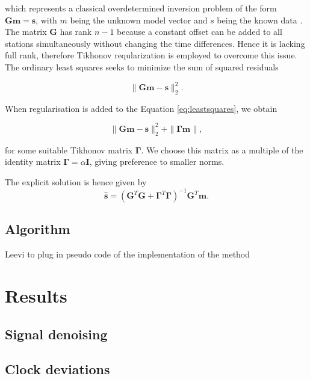 \documentclass[12pt,a4paper,english]{article}
\begin{document}
which represents a classical overdetermined inversion problem of the form $\mathbf{Gm} = \mathbf{s}$, with $m$ being the unknown model vector and $s$ being the known data \cite{sens2008}. The matrix $\mathbf{G}$ has rank $n-1$ because a constant offset can be added to all stations simultaneously without changing the time differences.
Hence it is lacking full rank, therefore Tikhonov reqularization is employed to overcome this issue. The ordinary least squares seeks to minimize the sum of squared residuals

\begin{equation}
\| \mathbf{Gm}-\mathbf{s} \|_2^2.
\label{eq:leastsquares}
\end{equation}

When regularisation is added to the Equation \ref{eq:leastsquares}, we obtain

\begin{equation}
\| \mathbf{Gm}-\mathbf{s} \|_2^2 + \| \bm{\Gamma}\mathbf{m} \|, 
\label{eq:tikhonov}
\end{equation}

for some suitable Tikhonov matrix $\bm{\Gamma}$. We choose this matrix as a multiple of the identity matrix $\bm{\Gamma} = \alpha\mathbf{I}$, giving preference to smaller norms. 

The explicit solution is hence given by 
\begin{equation}
\hat{\mathbf{s}} = (\mathbf{G}^T\mathbf{G} + \bm{\Gamma}^T\bm{\Gamma})^{-1}\mathbf{G}^T\mathbf{m}.  
\end{equation}

\subsection{Algorithm}
Leevi to plug in pseudo code of the implementation of the method

\section{Results}
\subsection{Signal denoising}


\subsection{Clock deviations}
\end{document}
